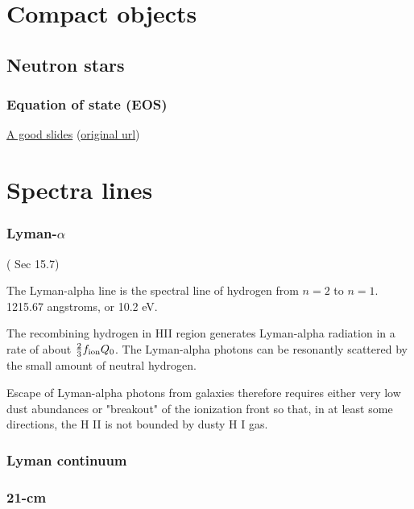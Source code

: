 \section{Compact objects}
\label{sec:org6e967b6}

\subsection{Neutron stars}
\label{sec:org44261e3}

\subsubsection{Equation of state (EOS)}
\label{sec:org8c325ce}

\href{attach/NS\_I-short-2020.pdf}{A good slides} (\href{https://www.tat.physik.uni-tuebingen.de/\~kokkotas/Teaching/GTR\_files/NS\_I-short-2020.pdf}{original url})


\section{Spectra lines}
\label{sec:org40fa667}
\subsubsection{Lyman-\(\alpha\)}
\label{sec:orga2fa127}
(\citealt{Draine2011} Sec 15.7)

The Lyman-alpha line is the spectral line of hydrogen from \(n=2\) to \(n=1\). 1215.67 angstroms, or 10.2 eV.

The recombining hydrogen in HII region generates Lyman-alpha radiation in a rate of about \(\frac{2}{3} f_{\rm ion} Q_0\). The Lyman-alpha photons can be resonantly scattered by the small amount of neutral hydrogen.

Escape of Lyman-alpha photons from galaxies therefore requires either very low dust abundances or "breakout" of the ionization front so that, in at least some directions, the H II is not bounded by dusty H I gas.

\subsubsection{Lyman continuum}
\label{sec:orga94a937}

\subsubsection{21-cm}
\label{sec:org9c49571}



